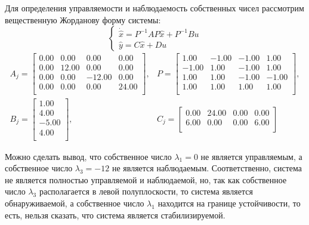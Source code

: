 Для определения управляемости и наблюдаемость собственных чисел рассмотрим вещественную Жорданову форму системы:
\begin{equation}
    \begin{cases}
        \dot{\hat{x}} = P^{-1}AP\hat{x} + P^{-1}Bu \\
        \hat{y} = C\hat{x} + Du
    \end{cases}
\end{equation}
\begin{equation}
    \begin{array}{cccc}
        A_j = \begin{bmatrix}
            0.00  & 0.00  & 0.00  & 0.00 \\ 
            0.00  & 12.00  & 0.00  & 0.00 \\ 
            0.00  & 0.00  & -12.00  & 0.00 \\ 
            0.00  & 0.00  & 0.00  & 24.00 \\ 
            \end{bmatrix}, &
        P = \begin{bmatrix}
            1.00  & -1.00  & -1.00  & 1.00 \\ 
            -1.00  & 1.00  & -1.00  & 1.00 \\ 
            1.00  & 1.00  & -1.00  & -1.00 \\ 
            1.00  & 1.00  & 1.00  & 1.00 \\ 
            \end{bmatrix}, \\
        B_j = \begin{bmatrix}
            1.00 \\ 
            4.00 \\ 
            -5.00 \\ 
            4.00 \\ 
            \end{bmatrix}, & 
        C_j = \begin{bmatrix}
            0.00  & 24.00  & 0.00  & 0.00 \\ 
            6.00  & 0.00  & 0.00  & 6.00 \\ 
        \end{bmatrix}
    \end{array}
\end{equation}

Можно сделать вывод, что собственное число $\lambda_1 = 0$ не является управляемым, 
а собственное число $\lambda_3 = -12$ не является наблюдаемым. Соответственно, 
система не является полностью управляемой и наблюдаемой, но, так как собственное число 
$\lambda_3$ располагается в левой полуплоскости, то система является обнаруживаемой, 
а собственное число $\lambda_1$ находится на границе устойчивости, то есть, нельзя 
сказать, что система является стабилизируемой.

